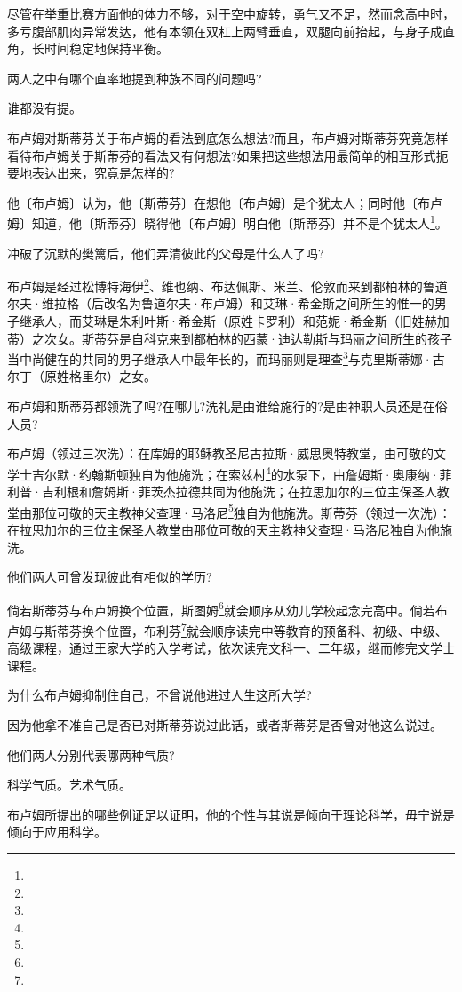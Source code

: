 \par 尽管在举重比赛方面他的体力不够，对于空中旋转，勇气又不足，然而念高中时，多亏腹部肌肉异常发达，他有本领在双杠上两臂垂直，双腿向前抬起，与身子成直角，长时间稳定地保持平衡。
\par 两人之中有哪个直率地提到种族不同的问题吗?
\par 谁都没有提。
\par 布卢姆对斯蒂芬关于布卢姆的看法到底怎么想法?而且，布卢姆对斯蒂芬究竟怎样看待布卢姆关于斯蒂芬的看法又有何想法?如果把这些想法用最简单的相互形式扼要地表达出来，究竟是怎样的?
\par 他〔布卢姆〕认为，他〔斯蒂芬〕在想他〔布卢姆〕是个犹太人；同时他〔布卢姆〕知道，他〔斯蒂芬〕晓得他〔布卢姆〕明白他〔斯蒂芬〕并不是个犹太人\footnote{}。
\par 冲破了沉默的樊篱后，他们弄清彼此的父母是什么人了吗?
\par 布卢姆是经过松博特海伊\footnote{}、维也纳、布达佩斯、米兰、伦敦而来到都柏林的鲁道尔夫·维拉格（后改名为鲁道尔夫·布卢姆）和艾琳·希金斯之间所生的惟一的男子继承人，而艾琳是朱利叶斯·希金斯（原姓卡罗利）和范妮·希金斯（旧姓赫加蒂）之次女。斯蒂芬是自科克来到都柏林的西蒙·迪达勒斯与玛丽之间所生的孩子当中尚健在的共同的男子继承人中最年长的，而玛丽则是理查\footnote{}与克里斯蒂娜·古尔丁（原姓格里尔）之女。
\par 布卢姆和斯蒂芬都领洗了吗?在哪儿?洗礼是由谁给施行的?是由神职人员还是在俗人员?
\par 布卢姆（领过三次洗）：在库姆的耶稣教圣尼古拉斯·威思奥特教堂，由可敬的文学士吉尔默·约翰斯顿独自为他施洗；在索兹村\footnote{}的水泵下，由詹姆斯·奥康纳·菲利普·吉利根和詹姆斯·菲茨杰拉德共同为他施洗；在拉思加尔的三位主保圣人教堂由那位可敬的天主教神父查理·马洛尼\footnote{}独自为他施洗。斯蒂芬（领过一次洗）：在拉思加尔的三位主保圣人教堂由那位可敬的天主教神父查理·马洛尼独自为他施洗。
\par 他们两人可曾发现彼此有相似的学历?
\par 倘若斯蒂芬与布卢姆换个位置，斯图姆\footnote{}就会顺序从幼儿学校起念完高中。倘若布卢姆与斯蒂芬换个位置，布利芬\footnote{}就会顺序读完中等教育的预备科、初级、中级、高级课程，通过王家大学的入学考试，依次读完文科一、二年级，继而修完文学士课程。
\par 为什么布卢姆抑制住自己，不曾说他进过人生这所大学?
\par 因为他拿不准自己是否已对斯蒂芬说过此话，或者斯蒂芬是否曾对他这么说过。
\par 他们两人分别代表哪两种气质?
\par 科学气质。艺术气质。
\par 布卢姆所提出的哪些例证足以证明，他的个性与其说是倾向于理论科学，毋宁说是倾向于应用科学。
